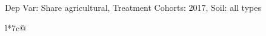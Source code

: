 \begin{table}[H]
\captionlistentry[table]{}
\label{table:beaver_land_class_DVis_land_class_1_SCg2_SSall_soil}
\scriptsize %
Dep Var: Share agricultural, Treatment Cohorts: 2017, Soil: all types \\
\begin{threeparttable}
\begin{tabulary}{\textwidth}{l*{7}{c}@{}}
\toprule \toprule
\noalign{\smallskip}
\noalign{\smallskip}
\midrule \bottomrule
\end{tabulary}
\medskip
\end{threeparttable}
\end{table}
